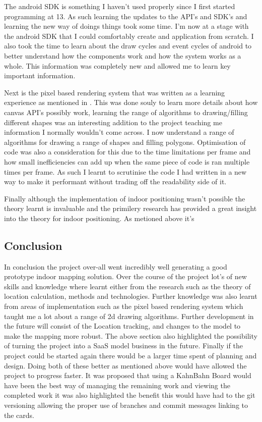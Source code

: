 The android SDK is something I haven't used properly since I first started programming at 13. As such learning the updates to the API's and SDK's and learning the new way of doings things took some time. I'm now at a stage with the android SDK that I could comfortably create and application from scratch. I also took the time to learn about the draw cycles and event cycles of android to better understand how the components work and how the system works as a whole. This information was completely new and allowed me to learn key important information.

Next is the pixel based rendering system that was written as a learning experience as mentioned in \citetemp. This was done souly to learn more details about how canvas API's possibly work, learning the range of algorithms to drawing/filling different shapes was an interesting addition to the project teaching me information I normally wouldn't come across. I now understand a range of algorithms for drawing a range of shapes and filling polygons. Optimisation of code was also a consideration for this due to the time limitations per frame and how small inefficiencies can add up when the same piece of code is ran multiple times per frame. As such I learnt to scrutinise the code I had written in a new way to make it performant without trading off the readability side of it.

Finally although the implementation of indoor positioning wasn't possible the theory learnt is invaluable and the primilery research has provided a great insight into the theory for indoor positioning. As metioned above it's 

\subsection{Conclusion}
In conclusion the project over-all went incredibly well generating a good prototype indoor mapping solution. Over the course of the project lot's of new skills and knowledge where learnt either from the research such as the theory of location calculation, methods and technologies. Further knowledge was also learnt from areas of implementation such as the pixel based rendering system which taught me a lot about a range of 2d drawing algorithms.
Further development in the future will consist of the Location tracking, and changes to the model to make the mapping more robust. The above section also highlighted the possibility of turning the project into a SaaS model business in the future.
Finally if the project could be started again there would be a larger time spent of planning and design. Doing both of these better as mentioned above would have allowed the project to progress faster. It was proposed that using a KahnBahn Board would have been the best way of managing the remaining work and viewing the completed work it was also highlighted the benefit this would have had to the git versioning allowing the proper use of branches and commit messages linking to the cards.
